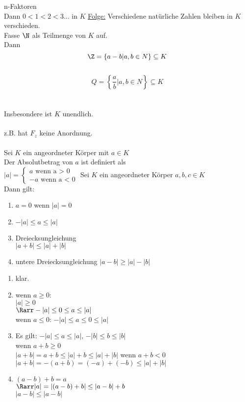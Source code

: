 	\phantom{Für $n \in \N$ setze XXX} n-Faktoren\\
	Dann $0 < 1 < 2 < 3 ... $ in $K$
	\underline{Folge:} Verschiedene natürliche Zahlen bleiben in $K$ verschieden.\\
	Fasse $\N$ als Teilmenge von $K$ auf.\\
	Dann $$\Z = \left\lbrace a - b | a, b \in N \right\rbrace \subseteq K$$\\
	\phantom{Dann }$$Q = \left\lbrace \frac{a}{b} | a, b \in N\right\rbrace \subseteq K$$\\ \\
	Insbesondere ist $K$ unendlich.\\
	\\
	z.B. hat $F_z$ keine Anordnung.\\
	\\
	Sei $K$ ein angeordneter Körper mit $a \in K$\\
	Der Absolutbetrag von $a$ ist definiert als \\
	$|a| = \left\lbrace \begin{array}{lll}
	\text{$a$ wenn a > 0}\\
	\text{$-a$ wenn a < 0}
	\end{array}\right.$
	Sei $K$ ein angeordneter Körper $a, b, c \in K$\\
	Dann gilt:
	\begin{enumerate}
	\item{$a = 0$ wenn $|a| = 0$}
	\item{$-|a| \leq a \leq |a|$}
	\item{Dreiecksungleichung\\
	$|a + b| \leq |a| + |b|$}
	\item{untere Dreiecksungleichung
	$|a - b| \geq |a| - |b|$} %
	\end{enumerate}
\bew
	\begin{enumerate}
	\item{klar.}
	\item{wenn $a \geq 0$:\\
	$|a| \geq 0$\\
	$\Rarr -|a| \leq 0 \leq a \leq |a|$\\
	wenn $a \leq 0$:
	$-|a| \leq a \leq 0 \leq |a|$}
	\item{Es gilt: $-|a| \leq a \leq |a|$, $-|b| \leq b \leq |b|$\\
	wenn $a + b \geq 0$\\
	$|a + b| = a + b \leq |a| + b \leq |a| + |b|$
	wenn $a + b < 0$\\
	$|a + b| = -(a + b) = (-a) + (-b) \leq |a| + |b|$}
	\item{$(a - b) + b = a$\\
	$\Rarr |a| = |(a - b) + b| \leq |a - b| + b$\\
	$|a - b| \leq |a - b|$} %
	\end{enumerate}
